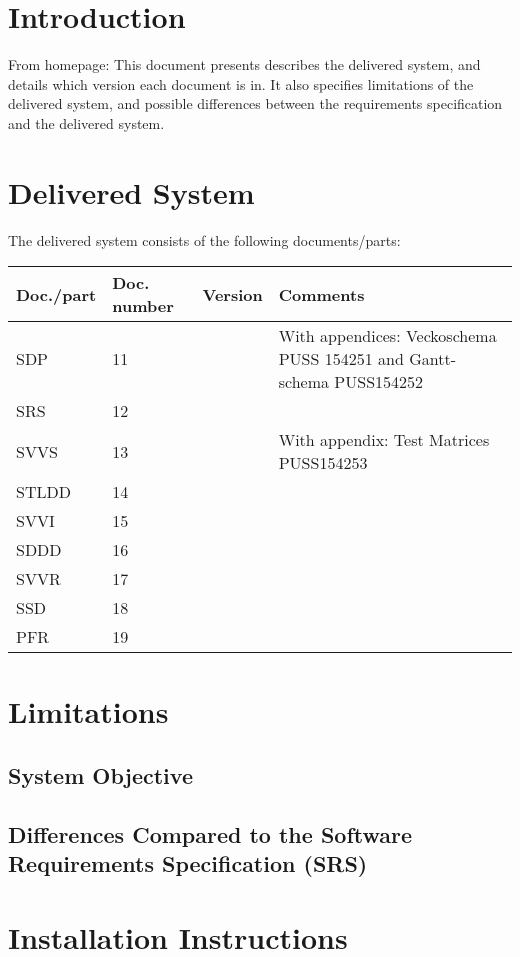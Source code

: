 \documentclass[a4paper]{article}
\begin{document}
\section{Introduction}





From homepage:
This document presents describes the delivered system, and details which version
each document is in. It also specifies limitations of the delivered system,
and possible differences between the requirements specification and the delivered
system.



\section{Delivered System}

The delivered system consists of the following documents/parts:

\begin{center}
\begin{tabular}{| l | l | l | p{5cm} |}
    \hline
    \textbf{Doc./part} & \textbf{Doc. number} & \textbf{Version} & \textbf{Comments} \\ \hline
    SDP & 11 &  & With appendices: Veckoschema PUSS 154251 and Gantt-schema PUSS154252 \\ \hline
    SRS & 12 &  & \\ \hline
    SVVS & 13 & & With appendix: Test Matrices PUSS154253 \\ \hline
    STLDD & 14 & & \\ \hline
    SVVI & 15 & & \\ \hline
    SDDD & 16 & & \\ \hline
    SVVR & 17 & & \\ \hline
    SSD & 18 & & \\ \hline
    PFR & 19 & & \\ \hline

\end{tabular}
\end{center}

\section{Limitations}

\subsection{System Objective}

\subsection{Differences Compared to the Software Requirements Specification (SRS)}



\section{Installation Instructions}
\end{document}

